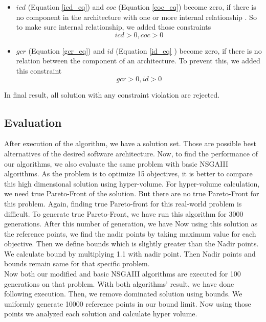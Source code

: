 \documentclass[letterpaper, 10 pt, conference]{ieeeconf}  %
\begin{document}
\begin{itemize}
    \item $icd$ (Equation \ref{icd_eq}) and $coc$ (Equation \ref{coc_eq}) become zero, if there is no component in the architecture with one or more internal relationship . So to make sure internal relationship, we added those constraints
    \begin{equation}
        icd>0, coc>0
    \end{equation}
    \item $gcr$ (Equation \ref{gcr_eq}) and $id$ (Equation \ref{id_eq} ) become zero, if there is no relation between the component of an architecture. To prevent this, we added this constraint
    \begin{equation}
        gcr>0, id>0
    \end{equation}
    
    
\end{itemize}


In final result, all solution with any constraint violation are rejected.


\subsection{Evaluation}
After execution of the algorithm, we have a solution set. Those are possible best alternatives of the desired software architecture. Now, to find the performance of our algorithms, we also evaluate the same problem with basic NSGAIII algorithms. As the problem is to optimize 15 objectives, it is better to compare this high dimensional solution using hyper-volume\cite{bader2011hype}. For hyper-volume calculation, we need true Pareto-Front of the solution. But there are no true Pareto-Front for this problem. Again, finding true Pareto-front for this real-world problem is difficult. To generate true Pareto-Front, we have run this algorithm for 3000 generations. After this number of generation, we have 
Now using this solution as the reference points, we find the nadir points by taking maximum value for each objective. Then we define bounds which is slightly greater than the Nadir points. We calculate bound by multiplying 1.1 with nadir point. Then Nadir points and bounds remain same for that specific problem. \\

Now both our modified and basic NSGAIII algorithms are executed for 100 generations on that problem. With both algorithms' result, we have done following execution. 
Then, we remove dominated solution using bounds. We uniformly generate 10000 reference points in our bound limit. Now using those points we analyzed each solution and calculate hyper volume.
\end{document}

